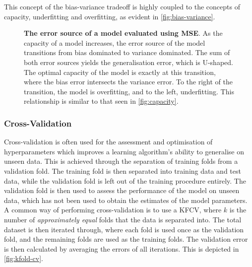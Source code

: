 This concept of the bias-variance tradeoff is highly coupled to the concepts of
capacity, underfitting and overfitting, as evident in
\autoref{fig:bias-variance}.

\begin{figure}[htp!]
    \centering
    
    \captionsetup{format=hang} %
    \caption{
        \textbf{The error source of a model evaluated using \gls{MSE}}. As the
        capacity of a model increases, the error source of the model transitions
        from bias dominated to variance dominated. The sum of both error sources
        yields the generalisation error, which is U-shaped. The optimal capacity
        of the model is exactly at this transition, where the bias error
        intersects the variance error. To the right of the transition, the model
        is overfitting, and to the left, underfitting. This relationship is
        similar to that seen in \autoref{fig:capacity}.
    }
    \label{fig:bias-variance}
\end{figure}



\subsubsection{Cross-Validation}
Cross-validation is often used for the assessment and optimisation of
hyperparameters which improves a learning algorithm's ability to generalise on
unseen data. This is achieved through the separation of training folds from a
validation fold. The training fold is then separated into training data and
test data, while the validation fold is left out of the training procedure
entirely. The validation fold is then used to assess the performance of the
model on unseen data, which has not been used to obtain the estimates of the
model parameters. A common way of performing cross-validation is to use a
\gls{KFCV}, where $k$ is the number of \textit{approximately
equal} folds that the data is separated into. The total dataset is then iterated
through, where each fold is used once as the validation fold, and the remaining
folds are used as the training folds. The validation error is then calculated by
averaging the errors of all iterations. This is depicted in
\autoref{fig:kfold-cv}. \cite[p.~241-245]{hastie2009elements}



